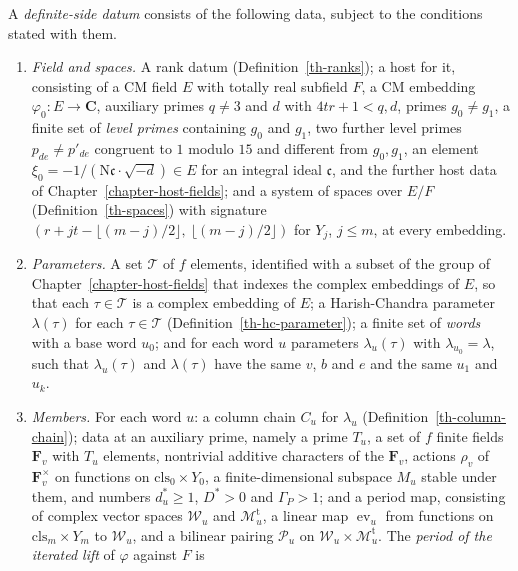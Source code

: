 \begin{definition}\label{th-definite-datum}
A \emph{definite-side datum} consists of the following data, subject to the
conditions stated with them.
\begin{enumerate}
\item \emph{Field and spaces.} A rank datum (Definition~\ref{th-ranks}); a
  host for it, consisting of a CM field $E$ with totally real subfield $F$,
  a CM embedding $\varphi_0\colon E\to\mathbf C$, auxiliary primes $q\neq3$ and
  $d$ with $4tr+1<q,d$, primes $g_0\neq g_1$, a finite set of \emph{level
  primes} containing $g_0$ and $g_1$, two further level primes
  $p_{de}\neq p'_{de}$ congruent to $1$ modulo $15$ and different from $g_0,g_1$,
  an element $\xi_0=-1/(\mathrm N\mathfrak c\cdot\sqrt{-d})\in E$ for an
  integral ideal $\mathfrak c$, and the further host data of
  Chapter~\ref{chapter-host-fields}; and a system of spaces over $E/F$
  (Definition~\ref{th-spaces}) with signature
  $(r+jt-\lfloor(m-j)/2\rfloor,\ \lfloor(m-j)/2\rfloor)$ for $Y_j$, $j\leq m$,
  at every embedding.
\item \emph{Parameters.} A set $\mathcal T$ of $f$ elements, identified with a
  subset of the group of Chapter~\ref{chapter-host-fields} that indexes the
  complex embeddings of $E$, so that each $\tau\in\mathcal T$ is a complex
  embedding of $E$; a Harish-Chandra parameter
  $\lambda(\tau)$ for each $\tau\in\mathcal T$
  (Definition~\ref{th-hc-parameter}); a finite set of \emph{words} with a base
  word $u_0$; and for each word $u$ parameters $\lambda_u(\tau)$ with
  $\lambda_{u_0}=\lambda$, such that $\lambda_u(\tau)$ and $\lambda(\tau)$
  have the same $v$, $b$ and $e$ and the same $u_1$ and $u_k$.
\item \emph{Members.} For each word $u$: a column chain $C_u$ for $\lambda_u$
  (Definition~\ref{th-column-chain}); data at an auxiliary prime, namely a
  prime $T_u$, a set of $f$ finite fields $\mathbf F_v$ with $T_u$ elements,
  nontrivial additive characters of the $\mathbf F_v$, actions $\rho_v$ of
  $\mathbf F_v^\times$ on functions on $\mathrm{cls}_0\times Y_0$, a
  finite-dimensional subspace $M_u$ stable under them, and numbers
  $d^*_u\geq1$, $D^*>0$ and $\Gamma_P>1$; and a period map, consisting of
  complex vector spaces $\mathcal W_u$ and $\mathcal M^{\mathrm t}_u$, a
  linear map $\operatorname{ev}_u$ from functions on
  $\mathrm{cls}_m\times Y_m$ to $\mathcal W_u$, and a bilinear pairing
  $\mathcal P_u$ on $\mathcal W_u\times\mathcal M^{\mathrm t}_u$. The
  \emph{period of the iterated lift} of $\varphi$ against $F$ is

\end{enumerate}
\end{definition}
